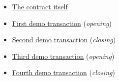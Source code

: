 \documentclass[12pt]{amsart}
\begin{document}
\begin{multicols}{2}
\begin{itemize}

\item \href{https://ropsten.etherscan.io/address/0x41b301c0b0abbfeef99803c23a281712e29b6ef1}{The contract itself}

\item \href{https://ropsten.etherscan.io/tx/0xe7aaa957e331475228e613c406a10fa25c0493d8f7d48a9384e4fbe81c36276d}{First demo transaction} (\textit{opening})
\item \href{https://ropsten.etherscan.io/tx/0xa38c0b765718955eb4bcc4e1029cbb538d314305f6a2aa37c2c0c4923f5895cf}{Second demo transaction} (\textit{closing})
\item \href{https://ropsten.etherscan.io/tx/0x0e89290f278d2cc67f38133ce336c38bc0f7689d074e6ac6d39658119bb9c201}{Third demo transaction} (\textit{opening})
\item \href{https://ropsten.etherscan.io/tx/0x89e1db8e0c4798e04d72623cc966a95bf63550c4382eb20f92f11fcbccc4d7cb}{Fourth demo transaction} (\textit{closing})
\end{itemize}



\end{multicols}
\end{document}
